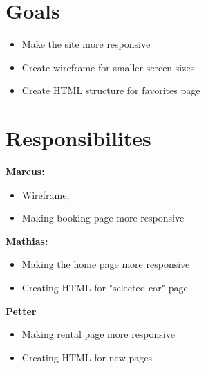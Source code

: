 \documentclass[a4paper,12pt]{article}
\begin{document}
\section{\textbf{Goals}}
\begin{itemize}
    \item Make the site more responsive
    \item Create wireframe for smaller screen sizes
    \item Create HTML structure for favorites page
\end{itemize}

\section{Responsibilites}
\textbf{Marcus:}
\begin{itemize}
    \item Wireframe, 
    \item Making booking page more responsive
\end{itemize}
\textbf{Mathias:}
\begin{itemize}
    \item Making the home page more responsive
    \item Creating HTML for "selected car" page
\end{itemize}
\textbf{Petter}
\begin{itemize}
    \item Making rental page more responsive
    \item Creating HTML for new pages
\end{itemize}
\end{document}
